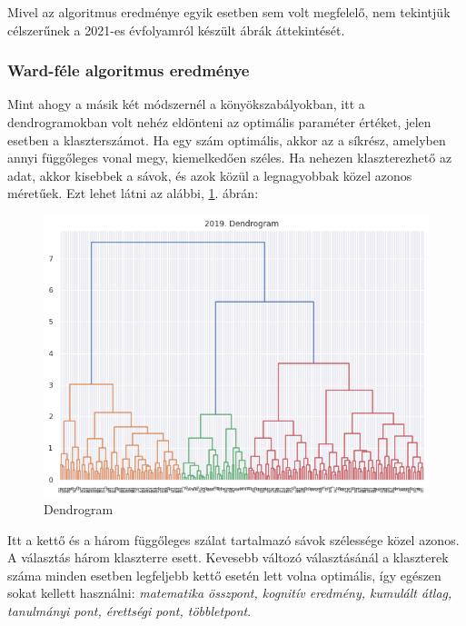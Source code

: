 \documentclass[12pt]{article}
\begin{document}
Mivel az algoritmus eredménye egyik esetben sem volt megfelelő, nem tekintjük célszerűnek a 2021-es évfolyamról készült ábrák áttekintését.

\subsubsection{Ward-féle algoritmus eredménye}

Mint ahogy a másik két módszernél a könyökszabályokban, itt a dendrogramokban volt nehéz eldönteni az optimális paraméter értéket, jelen esetben a klaszterszámot. Ha egy szám optimális, akkor az a síkrész, amelyben annyi függőleges vonal megy, kiemelkedően széles. Ha nehezen klaszterezhető az adat, akkor kisebbek a sávok, és azok közül a legnagyobbak közel azonos méretűek. Ezt lehet látni az alábbi, \ref{fig:dendrogram}. ábrán:

\begin{figure}[H]
\centering
\includegraphics[width = \textwidth]{kepek/dendrogram.png}
\caption{Dendrogram}
\label{fig:dendrogram}
\end{figure}

Itt a kettő és a három függőleges szálat tartalmazó sávok szélessége közel azonos. A választás három klaszterre esett. Kevesebb változó választásánál a klaszterek száma minden esetben legfeljebb kettő esetén lett volna optimális, így egészen sokat kellett használni: \textit{matematika összpont, kognitív eredmény, kumulált átlag, tanulmányi pont, érettségi pont, többletpont}.
\end{document}
